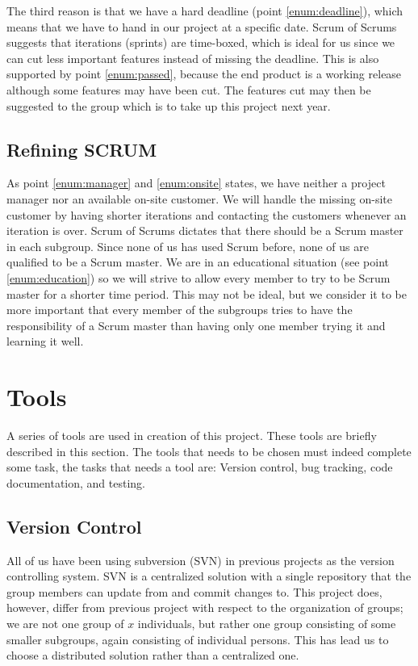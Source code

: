 The third reason is that we have a hard deadline (point \ref{enum:deadline}), which means that we have to hand in our project at a specific date.
Scrum of Scrums suggests that iterations (sprints) are time-boxed, which is ideal for us since we can cut less important features instead of missing the deadline.
This is also supported by point \ref{enum:passed}, because the end product is a working release although some features may have been cut.
The features cut may then be suggested to the group which is to take up this project next year.


\subsection{Refining SCRUM} 
As point \ref{enum:manager} and \ref{enum:onsite} states, we have neither a project manager nor an available on-site customer.
We will handle the missing on-site customer by having shorter iterations and contacting the customers whenever an iteration is over.
Scrum of Scrums\cite{scrumOfScrums} dictates that there should be a Scrum master in each subgroup.
Since none of us has used Scrum before, none of us are qualified to be a Scrum master.
We are in an educational situation (see point \ref{enum:education}) so we will strive to allow every member to try to be Scrum master for a shorter time period.
This may not be ideal, but we consider it to be more important that every member of the subgroups tries to have the responsibility of a Scrum master than having only one member trying it and learning it well.

\begin{comment}
There is more:
*Scrum board
*The phases / meetings
**estimation
**sprint planning
*Scrum meetings
*Scrum of scrum def
*project manager problem
\end{comment}


\section{Tools}\label{subsec:tools}
A series of tools are used in creation of this project.
These tools are briefly described in this section.
The tools that needs to be chosen must indeed complete some task, the tasks that needs a tool are: Version control, bug tracking, code documentation, and testing.

\subsection{Version Control}
All of us have been using subversion (SVN) in previous projects as the version controlling system.
SVN is a centralized solution \cite{subversion} with a single repository that the group members can update from and commit changes to.
This project does, however, differ from previous project with respect to the organization of groups; we are not one group of $x$ individuals, but rather one group consisting of some smaller subgroups, again consisting of individual persons.
This has lead us to choose a distributed solution rather than a centralized one.

